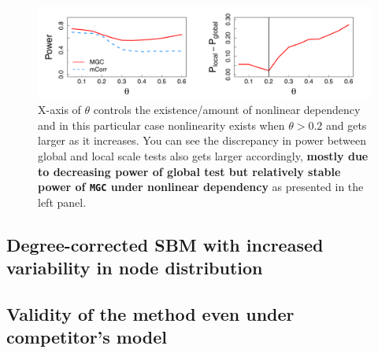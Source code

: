 \documentclass[12pt]{article}
\begin{document}
\begin{figure}[h]
	\centering
	\includegraphics[width=\linewidth]{../Figure/powerplot_simple.pdf}
	\caption{X-axis of $\theta$ controls the existence/amount of nonlinear dependency and in this particular case nonlinearity exists when $\theta > 0.2$ and gets larger as it increases. You can see the discrepancy in power between global and local scale tests also gets larger accordingly, \textbf{mostly due to decreasing power of global test but relatively stable power of \texttt{MGC} under nonlinear dependency} as presented in the left panel.}
	\label{fig:powerplot}
\end{figure}


\subsection*{Degree-corrected SBM with increased variability in node distribution}	
\subsection*{Validity of the method even under competitor's model}
\end{document}
